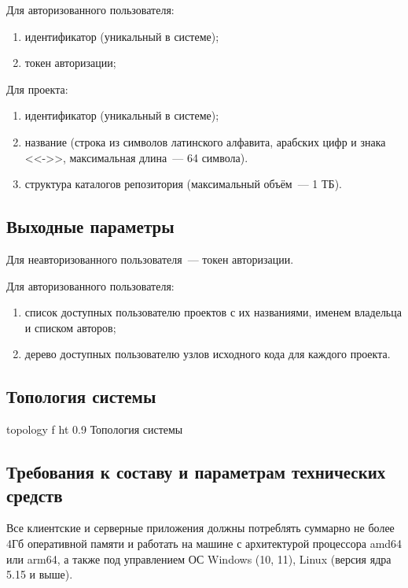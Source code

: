 \documentclass{bmstu}
\begin{document}
  Для авторизованного пользователя:
  \begin{enumerate}[label*=\arabic*)]
    \item идентификатор (уникальный в системе);
    \item токен авторизации;
  \end{enumerate}

  Для проекта:
  \begin{enumerate}[label*=\arabic*)]
    \item идентификатор (уникальный в системе);
    \item название (строка из символов латинского алфавита, арабских
      цифр и знака <<->>, максимальная длина~--- 64 символа).
    \item структура каталогов репозитория (максимальный объём~--- 1
      ТБ).
  \end{enumerate}

  \subsection{Выходные параметры}

  Для неавторизованного пользователя~--- токен авторизации.

  Для авторизованного пользователя:
  \begin{enumerate}[label*=\arabic*)]
    \item список доступных пользователю проектов с их названиями,
      именем владельца и списком авторов;
    \item дерево доступных пользователю узлов исходного кода для
      каждого проекта.
  \end{enumerate}

  \subsection{Топология системы}

    {topology}
    {f}
    {ht}
    {0.9 \textwidth}
    {Топология системы}

  \subsection{Требования к составу и параметрам технических средств}

  Все клиентские и серверные приложения должны потреблять суммарно не
  более 4Гб оперативной памяти и работать на машине с архитектурой
  процессора amd64 или arm64, а также под управлением ОС Windows (10,
  11), Linux (версия ядра 5.15 и выше).
\end{document}
